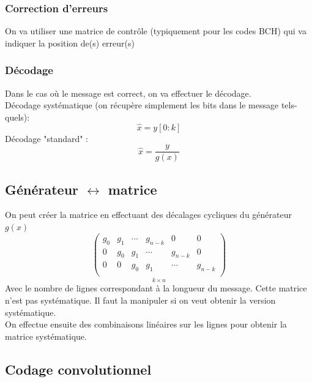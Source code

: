 \documentclass[resume.tex]{subfiles}
\begin{document}
\subsubsection{Correction d'erreurs}
On va utiliser une matrice de contrôle (typiquement pour les codes BCH) qui va indiquer la position de(s) erreur(s)
\subsubsection{Décodage}
Dans le cas où le message est correct, on va effectuer le décodage.\\
Décodage systématique (on récupère simplement les bits dans le message tels-quels):
$$\hat{x}=y[0:k]$$
Décodage "standard" :
$$\hat{x}=\frac{y}{g(x)}$$
\subsection{Générateur $\leftrightarrow$ matrice}
On peut créer la matrice en effectuant des décalages cycliques du générateur $g(x)$
$$\underset{k\times n}{\begin{pmatrix}
g_0 & g_1 & \cdots & g_{n-k} & 0 & 0\\
0 & g_0 & g_1 & \cdots & g_{n-k} & 0\\
0 & 0 & g_0 & g_1 & \cdots & g_{n-k}\\
\end{pmatrix}}$$
Avec le nombre de lignes correspondant à la longueur du message. Cette matrice n'est pas systématique. Il faut la manipuler si on veut obtenir la version systématique.\\
On effectue ensuite des combinaisons linéaires sur les lignes pour obtenir la matrice systématique.
\subsection{Codage convolutionnel}
\end{document}
